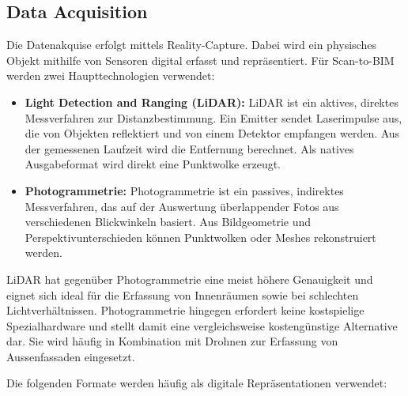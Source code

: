 \subsection{Data Acquisition}
\begin{German}
    Die Datenakquise erfolgt mittels Reality-Capture. Dabei wird ein physisches Objekt mithilfe von Sensoren digital erfasst und repräsentiert. Für Scan-to-BIM werden zwei Haupttechnologien verwendet:
    
    \begin{itemize}
        \item \textbf{Light Detection and Ranging (LiDAR):} LiDAR ist ein aktives, direktes Messverfahren zur Distanzbestimmung. Ein Emitter sendet Laserimpulse aus, die von Objekten reflektiert und von einem Detektor empfangen werden. Aus der gemessenen Laufzeit wird die Entfernung berechnet. Als natives Ausgabeformat wird direkt eine Punktwolke erzeugt. \cite{rashdiScanningTechnologiesBuilding2022}
        \item \textbf{Photogrammetrie:} Photogrammetrie ist ein passives, indirektes Messverfahren, das auf der Auswertung überlappender Fotos aus verschiedenen Blickwinkeln basiert. Aus Bildgeometrie und Perspektivunterschieden können Punktwolken oder Meshes rekonstruiert werden. \cite{rashdiScanningTechnologiesBuilding2022}
    \end{itemize}

    LiDAR hat gegenüber Photogrammetrie eine meist höhere Genauigkeit und eignet sich ideal für die Erfassung von Innenräumen sowie bei schlechten Lichtverhältnissen. Photogrammetrie hingegen erfordert keine kostspielige Spezialhardware und stellt damit eine vergleichsweise kostengünstige Alternative dar. Sie wird häufig in Kombination mit Drohnen zur Erfassung von Aussenfassaden eingesetzt. \cite{rashdiScanningTechnologiesBuilding2022}
    
    Die folgenden Formate werden häufig als digitale Repräsentationen verwendet:


\end{German}
